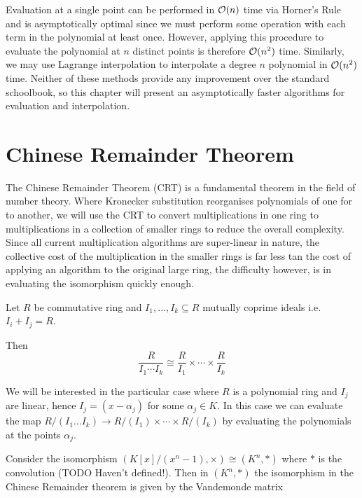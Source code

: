 \medskip

Evaluation at a single point can be performed in $\mathcal O(n)$ time via Horner's Rule and is asymptotically optimal since we must perform some operation with each term in the polynomial at least once. However, applying this procedure to evaluate the polynomial at $n$ distinct points is therefore $\mathcal O(n^2)$ time. Similarly, we may use Lagrange interpolation to interpolate a degree $n$ polynomial in $\mathcal O(n^2)$ time. Neither of these methods provide any improvement over the standard schoolbook, so this chapter will present an asymptotically faster algorithms for evaluation and interpolation.

\section{Chinese Remainder Theorem}%
\label{sec:crt}

The Chinese Remainder Theorem (CRT) is a fundamental theorem in the field of number theory. Where Kronecker substitution reorganises polynomials of one for to another, we will use the CRT to convert multiplications in one ring to multiplications in a collection of smaller rings to reduce the overall complexity. Since all current multiplication algorithms are super-linear in nature, the collective cost of the multiplication in the smaller rings is far less tan the cost of applying an algorithm to the original large ring, the difficulty however, is in evaluating the isomorphism quickly enough.

\begin{theorem}
    Let $R$ be commutative ring and $I_1, \ldots, I_k \subseteq R$ mutually coprime ideals i.e. $I_i + I_j = R$.

    Then
    \[
        \frac{R}{I_1\cdots I_k} \cong \frac{R}{I_1} \times \cdots \times \frac{R}{I_k}
    \]
\end{theorem}

\medskip

We will be interested in the particular case where $R$ is a polynomial ring and $I_j$ are linear, hence $I_j = (x - \alpha_j)$ for some $\alpha_j \in K$. In this case we can evaluate the map $R/(I_1\ldots I_k) \to R/(I_1) \times \cdots \times R/(I_k)$ by evaluating the polynomials at the points $\alpha_j$.

Consider the isomorphism $(K[x]/(x^n - 1), \times) \cong (K^n, \ast)$ where $\ast$ is the convolution (TODO Haven't defined!). Then in $(K^n, \ast)$ the isomorphism in the Chinese Remainder theorem is given by the Vandemonde matrix

